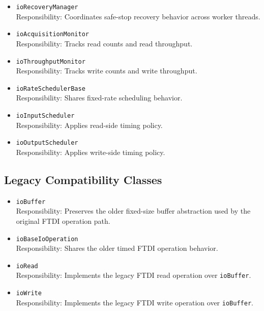 \begin{itemize}
    \item \texttt{ioRecoveryManager} \\
    Responsibility: Coordinates safe-stop recovery behavior across worker threads.

    \item \texttt{ioAcquisitionMonitor} \\
    Responsibility: Tracks read counts and read throughput.

    \item \texttt{ioThroughputMonitor} \\
    Responsibility: Tracks write counts and write throughput.

    \item \texttt{ioRateSchedulerBase} \\
    Responsibility: Shares fixed-rate scheduling behavior.

    \item \texttt{ioInputScheduler} \\
    Responsibility: Applies read-side timing policy.

    \item \texttt{ioOutputScheduler} \\
    Responsibility: Applies write-side timing policy.
\end{itemize}

\subsection{Legacy Compatibility Classes}
\begin{itemize}
    \item \texttt{ioBuffer} \\
    Responsibility: Preserves the older fixed-size buffer abstraction used by the original FTDI operation path.

    \item \texttt{ioBaseIoOperation} \\
    Responsibility: Shares the older timed FTDI operation behavior.

    \item \texttt{ioRead} \\
    Responsibility: Implements the legacy FTDI read operation over \texttt{ioBuffer}.

    \item \texttt{ioWrite} \\
    Responsibility: Implements the legacy FTDI write operation over \texttt{ioBuffer}.
\end{itemize}

